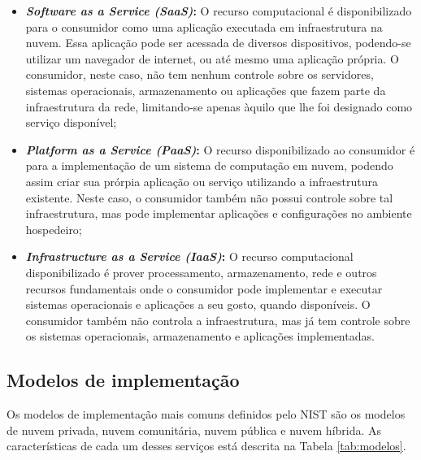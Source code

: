 \documentclass[
	12pt,				%
	oneside,			%
	a4paper,			%
	chapter=TITLE,		%
	english,			%
	french,				%
	spanish,			%
	brazil				%
	]{abntex2}
\begin{document}
\begin{itemize}
	\item \textbf{\emph{Software as a Service (SaaS)}:} O recurso computacional é disponibilizado para o consumidor como uma aplicação executada em infraestrutura na nuvem. Essa aplicação pode ser acessada de diversos dispositivos, podendo-se utilizar um navegador de internet, ou até mesmo uma aplicação própria. O consumidor, neste caso, não tem nenhum controle sobre os servidores, sistemas operacionais, armazenamento ou aplicações que fazem parte da infraestrutura da rede, limitando-se apenas àquilo que lhe foi designado como serviço disponível;
	\item \textbf{\emph{Platform as a Service (PaaS)}:} O recurso disponibilizado ao consumidor é para a implementação de um sistema de computação em nuvem, podendo assim criar sua prórpia aplicação ou serviço utilizando a infraestrutura existente. Neste caso, o consumidor também não possui controle sobre tal infraestrutura, mas pode implementar aplicações e configurações no ambiente hospedeiro;
	\item \textbf{\emph{Infrastructure as a Service (IaaS)}:} O recurso computacional disponibilizado é prover processamento, armazenamento, rede e outros recursos fundamentais onde o consumidor pode implementar e executar sistemas operacionais e aplicações a seu gosto, quando disponíveis. O consumidor também não controla a infraestrutura, mas já tem controle sobre os sistemas operacionais, armazenamento e aplicações implementadas.
\end{itemize}

\subsection{Modelos de implementação}\label{modelosimp}

Os modelos de implementação mais comuns definidos pelo NIST são os modelos de nuvem privada, nuvem comunitária, nuvem pública e nuvem híbrida. As características de cada um desses serviços está descrita na Tabela \ref{tab:modelos}.
\end{document}

